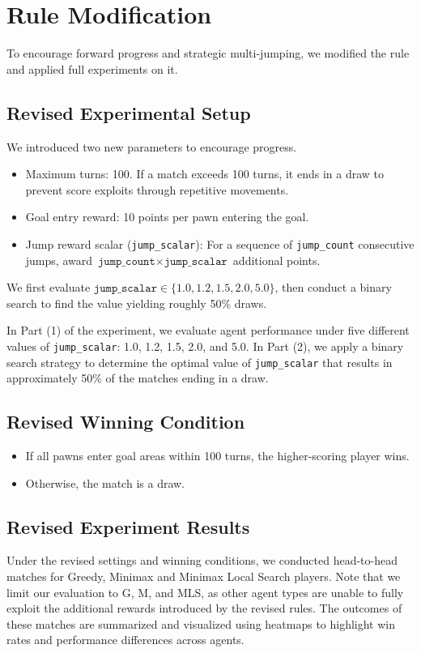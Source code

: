 \section{Rule Modification}
To encourage forward progress and strategic multi-jumping, we modified the rule and applied full experiments on it.

\subsection{Revised Experimental Setup}

We introduced two new parameters to encourage progress.
\begin{itemize}
  \item Maximum turns: 100.  
    If a match exceeds 100 turns, it ends in a draw to prevent score exploits through repetitive movements.
  \item Goal entry reward: 10 points per pawn entering the goal.
  \item Jump reward scalar (\texttt{jump\_scalar}):  
    For a sequence of \texttt{jump\_count} consecutive jumps, award \(\texttt{jump\_count} \times \texttt{jump\_scalar}\) additional points.
\end{itemize}

We first evaluate \(\texttt{jump\_scalar}\in\{1.0,1.2,1.5,2.0,5.0\}\), then conduct a binary search to find the value yielding roughly 50\% draws.

In Part (1) of the experiment, we evaluate agent performance under five different values of \texttt{jump\_scalar}: 1.0, 1.2, 1.5, 2.0, and 5.0. In Part (2), we apply a binary search strategy to determine the optimal value of \texttt{jump\_scalar} that results in approximately 50\% of the matches ending in a draw.

\subsection{Revised Winning Condition}

\begin{itemize}
  \item If all pawns enter goal areas within 100 turns, the higher-scoring player wins.
  \item Otherwise, the match is a draw.
\end{itemize}

\subsection{Revised Experiment Results}
Under the revised settings and winning conditions, we conducted head-to-head matches for Greedy, Minimax and Minimax Local Search players. Note that we limit our evaluation to G, M, and MLS, as other agent types are unable to fully exploit the additional rewards introduced by the revised rules. The outcomes of these matches are summarized and visualized using heatmaps to highlight win rates and performance differences across agents.

